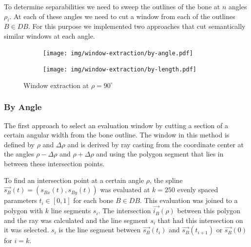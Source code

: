 \documentclass[pdftex,12pt,a4paper]{report}
\begin{document}
To determine separabilities we need to sweep the outlines of the bone at $n$ angles $\rho_i$. At each of these angles we need to cut a window from each of the outlines $B \in DB$. For this purpose we implemented two approaches that cut semantically similar windows at each angle.

\begin{figure}[h]
	\centering
	\begin{subfigure}[b]{0.32\textwidth}
		\centering
		\texttt{[image: img/window-extraction/by-angle.pdf]}
		\label{fig:window-extraction-angle}
	\end{subfigure}
	\begin{subfigure}[b]{0.32\textwidth}
		\centering
		\texttt{[image: img/window-extraction/by-length.pdf]}
		\label{fig:window-extraction-length}
	\end{subfigure}
	\begin{subfigure}[b]{0.32\textwidth}
		\centering
		\label{fig:window-extraction-all}
	\end{subfigure}
	\caption{Window extraction at $\rho=90^\circ$}
	\label{fig:window-extraction}
\end{figure}


\subsubsection{By Angle}
\label{subsub:windowbyangle}

The first approach to select an evaluation window by cutting a section of a certain angular
width from the bone outline. The window in this method is defined by $\rho$ and $\Delta\rho$
and is derived by ray casting from the coordinate center at the angles $\rho - \Delta\rho$ and 
$\rho + \Delta\rho$ and using the polygon segment that lies in between these intersection points. 

To find an intersection point at a certain angle $\rho$, the spline $\vec{s_B}(t) = (s_{Bx}(t), s_{By}(t))$ was evaluated at $k=250$ evenly spaced
parameters $t_i \in [0,1]$ for each bone $B \in DB$. This evaluation was joined to a polygon
with $k$ line segments $s_i$. The intersection $\vec{i_B}(\rho)$ between this polygon and the ray was calculated and
the line segment $s_i$ that had this intersection on it was selected. $s_i$ is the line
segment between $\vec{s_B}(t_i)$ and $\vec{s_B}(t_{i+1})$ or $\vec{s_B}(0)$ for $i=k$.
\end{document}
